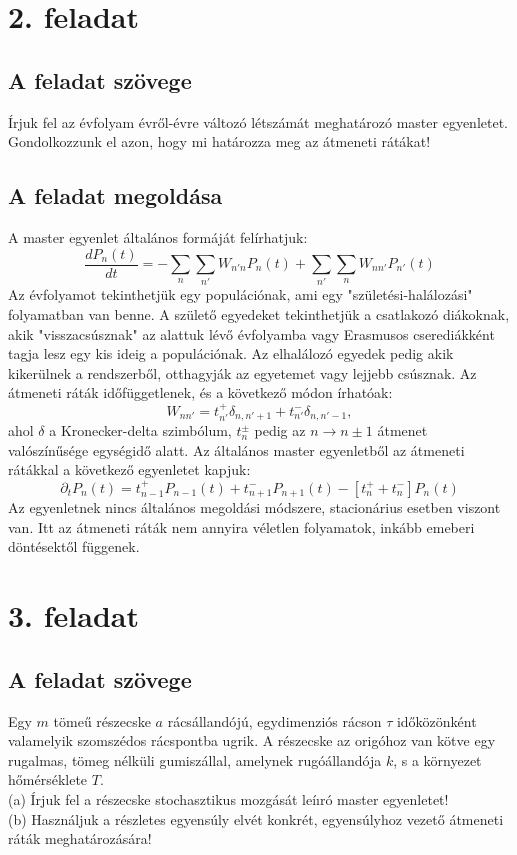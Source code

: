 \documentclass[12pt]{article}
\begin{document}
\section*{2. feladat}
\subsection*{A feladat szövege}
Írjuk fel az évfolyam évről-évre változó létszámát meghatározó master egyenletet. Gondolkozzunk el azon, hogy mi határozza meg az átmeneti rátákat!

\subsection*{A feladat megoldása}
A master egyenlet általános formáját felírhatjuk:
$$\frac{dP_n(t)}{dt} = -\sum_n\sum_{n'}W_{n'n}P_n(t)+ \sum_{n'}\sum_{n}W_{nn'}P_{n'}(t)$$
Az évfolyamot tekinthetjük egy populációnak, ami egy "születési-halálozási" folyamatban van benne.  A születő egyedeket tekinthetjük a csatlakozó diákoknak, akik "visszacsúsznak" az alattuk lévő évfolyamba vagy Erasmusos cserediákként tagja lesz egy kis ideig a populációnak. Az elhalálozó egyedek pedig akik kikerülnek a rendszerből, otthagyják az egyetemet vagy lejjebb csúsznak. Az átmeneti ráták időfüggetlenek, és a következő módon írhatóak\cite{book}:
$$W_{nn'} = t^+_{n'}\delta_{n,n'+1}+t^-_{n'}\delta_{n,n'-1},$$
ahol $\delta$ a Kronecker-delta szimbólum, $t^\pm_n$ pedig az $n \to n\pm1$ átmenet valószínűsége egységidő alatt. Az általános master egyenletből az átmeneti rátákkal a következő egyenletet kapjuk:
$$\partial_tP_n(t) = t^+_{n-1}P_{n-1}(t)+ t^-_{n+1}P_{n+1}(t) - [t^+_n + t^-_n]P_n(t)$$
Az egyenletnek nincs általános megoldási módszere, stacionárius esetben viszont van. Itt az átmeneti ráták nem annyira véletlen folyamatok, inkább emeberi döntésektől függenek.
\newpage
\section*{3. feladat}
\subsection*{A feladat szövege}
Egy $m$ tömeű részecske $a$ rácsállandójú, egydimenziós rácson $\tau$ időközönként valamelyik
szomszédos rácspontba ugrik. A részecske az origóhoz van kötve egy rugalmas, tömeg nélküli gumiszállal, amelynek rugóállandója $k$, s a környezet hőmérséklete $T$.\\
(a) Írjuk fel a részecske stochasztikus mozgását leíıró master egyenletet!\\
(b) Használjuk a részletes egyensúly elvét konkrét, egyensúlyhoz vezető átmeneti ráták meghatározására!
\end{document}
